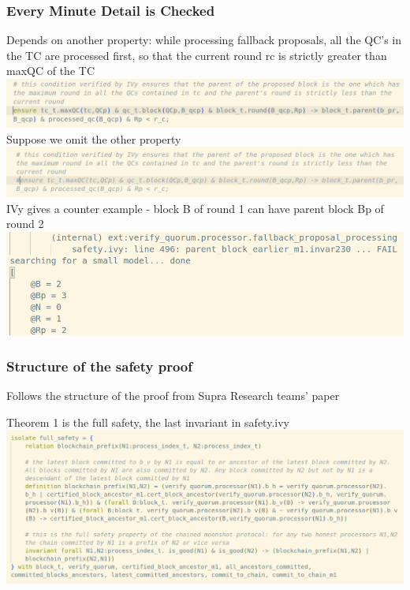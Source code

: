 \documentclass{beamer}
\begin{document}
\begin{frame}
    \frametitle{Every Minute Detail is Checked}
    Depends on another property: while processing fallback proposals,
    all the QC's in the TC are processed first, so that the current
    round 
    r\textunderscore{}c is strictly greater
    than maxQC of the TC 
    \includegraphics[scale=0.25]{RcGtMaxQC.png}
    \pause
    Suppose we omit the other property
    \includegraphics[scale=0.25]{RcGtMaxQCOmit.png}
    \pause
    IVy gives a counter example - block B of round 1 can have parent
    block Bp of round 2
    \includegraphics[scale=0.25]{ParentBlockEarlierViolated.png}
\end{frame}

\begin{frame}
    \frametitle{Structure of the safety proof}
    Follows the structure of the proof from Supra Research teams'
    paper

    Theorem 1 is the full safety, the last invariant in safety.ivy
    \includegraphics[scale=0.25]{FullSafety.png}
\end{frame}
\end{document}
